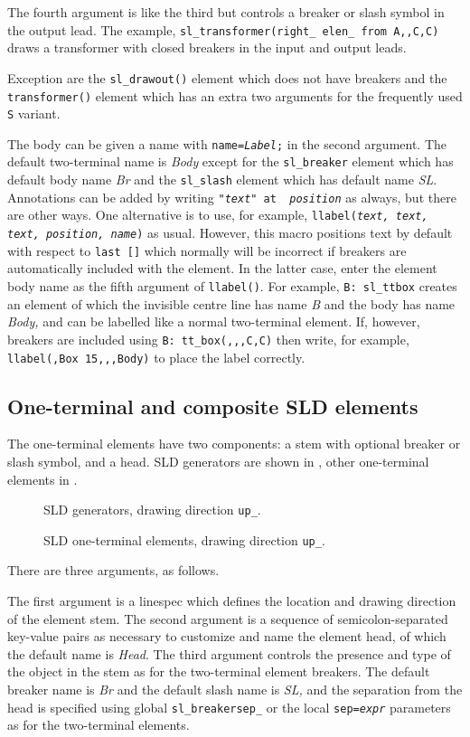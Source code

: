 The fourth argument is like the third but controls a breaker or slash
symbol in the output
lead. The example, {\tt sl\_transformer(right\_ elen\_ from A,,C,C)}
draws a transformer with closed breakers in the input and output leads.

Exception are the {\tt sl\_drawout()} element which does not have breakers
and the {\tt transformer()} element which has an extra two arguments for
the frequently used {\tt S} variant.

The body can be given a name with {\tt name={\sl Label};} in the
second argument. The default two-terminal name is {\sl Body}
except for the {\tt sl\_breaker} element which has default body name {\sl Br}
and the {\tt sl\_slash} element which has default name {\sl SL}.
Annotations can be added by writing {\tt "{\sl text}" at {\sl
position}} as always, but there are other ways.  One alternative is to
use, for example, {\tt llabel({\sl text, text, text, position, name})}
as usual.  However, this macro positions text by default with respect
to {\tt last []} which normally will be incorrect if breakers are
automatically included with the element.
In the latter case, enter the element body name as the fifth argument
of {\tt llabel()}.
For example, {\tt B: sl\_ttbox} creates an element of which
the invisible centre line has name {\sl B} and the body has name {\sl Body,}
and can be labelled like a normal two-terminal element.  If, however,
breakers are included using {\tt B: tt\_box(,{,},C,C)} then write, for example,
{\tt llabel(,Box 15,{,},Body)} to place the label correctly.

\subsection{One-terminal and composite SLD elements\label{OneTermSLD:}}
The one-terminal elements have two components: a stem with optional
breaker or slash symbol, and a head.
SLD generators are shown in , other
one-terminal elements in .
\begin{figure}[h!t]
   \SLDGenerators
   \caption{SLD generators, drawing direction {\tt up\_}.}
   \label{SLDGenerators}
   \end{figure}
\begin{figure}[h!t]
   \SLDOneTerms
   \caption{SLD one-terminal elements, drawing direction {\tt up\_}.}
   \label{SLDOneTerms}
   \end{figure}
There are three arguments, as follows.

The first argument is a linespec which defines the location and drawing
direction of the element stem.
The second argument is a sequence of semicolon-separated key-value pairs
as necessary to customize and name the element head, of which the
default name is {\sl Head}.
The third argument controls the presence and type of the object in the stem
as for the two-terminal element breakers.  The default breaker name is {\sl Br}
and the default slash name is {\sl SL,} and the separation from the head
is specified using global {\tt sl\_breakersep\_} or the local
{\tt sep={\sl expr}} parameters as for the two-terminal elements.

